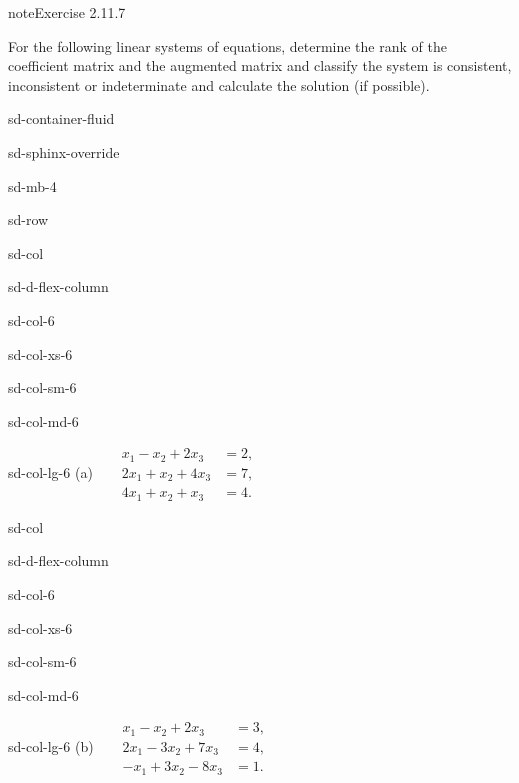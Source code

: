 \documentclass[letterpaper,10pt,english]{jupyterBook}
\begin{document}
\begin{sphinxadmonition}{note}{Exercise 2.11.7}



\sphinxAtStartPar
For the following linear systems of equations, determine the rank of the coefficient matrix and the augmented matrix and classify the system is consistent, inconsistent or indeterminate and calculate the solution (if possible).

\begin{sphinxuseclass}{sd-container-fluid}
\begin{sphinxuseclass}{sd-sphinx-override}
\begin{sphinxuseclass}{sd-mb-4}
\begin{sphinxuseclass}{sd-row}
\begin{sphinxuseclass}{sd-col}
\begin{sphinxuseclass}{sd-d-flex-column}
\begin{sphinxuseclass}{sd-col-6}
\begin{sphinxuseclass}{sd-col-xs-6}
\begin{sphinxuseclass}{sd-col-sm-6}
\begin{sphinxuseclass}{sd-col-md-6}
\begin{sphinxuseclass}{sd-col-lg-6}
\sphinxAtStartPar
(a)   
\( \begin{align*}
     x_{1} -  x_{2} + 2 x_{3} &= 2, \\
     2 x_{1} +  x_{2} + 4 x_{3} &= 7, \\
     4 x_{1} +  x_{2} +  x_{3} &= 4.
\end{align*} \)

\end{sphinxuseclass}
\end{sphinxuseclass}
\end{sphinxuseclass}
\end{sphinxuseclass}
\end{sphinxuseclass}
\end{sphinxuseclass}
\end{sphinxuseclass}
\begin{sphinxuseclass}{sd-col}
\begin{sphinxuseclass}{sd-d-flex-column}
\begin{sphinxuseclass}{sd-col-6}
\begin{sphinxuseclass}{sd-col-xs-6}
\begin{sphinxuseclass}{sd-col-sm-6}
\begin{sphinxuseclass}{sd-col-md-6}
\begin{sphinxuseclass}{sd-col-lg-6}
\sphinxAtStartPar
(b)  
\( \begin{align*}
     x_{1} -  x_{2} + 2 x_{3} &= 3, \\
     2 x_{1} - 3 x_{2} + 7 x_{3} &= 4, \\
     - x_{1} + 3 x_{2} - 8 x_{3} &= 1.
\end{align*} \)


\end{sphinxuseclass}
\end{sphinxuseclass}
\end{sphinxuseclass}
\end{sphinxuseclass}
\end{sphinxuseclass}
\end{sphinxuseclass}
\end{sphinxuseclass}
\end{sphinxuseclass}
\end{sphinxuseclass}
\end{sphinxuseclass}
\end{sphinxuseclass}
\end{sphinxadmonition}
\end{document}
